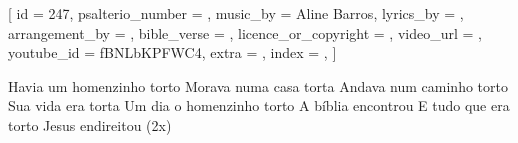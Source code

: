 
[
    id                     = {247},
    psalterio_number       = {},
    music_by               = {Aline Barros},
    lyrics_by              = {},
    arrangement_by         = {},
    bible_verse            = {},
    licence_or_copyright   = {},
    video_url              = {},
    youtube_id             = {fBNLbKPFWC4}, %
    extra                  = {},
    index                  = {},
]


\beginchorus

Havia um homenzinho torto 
Morava numa casa torta 
Andava num caminho torto 
Sua vida era torta
Um dia o homenzinho torto 
A bíblia encontrou
E tudo que era torto
Jesus endireitou
(2x)
\endchorus


\endsong
